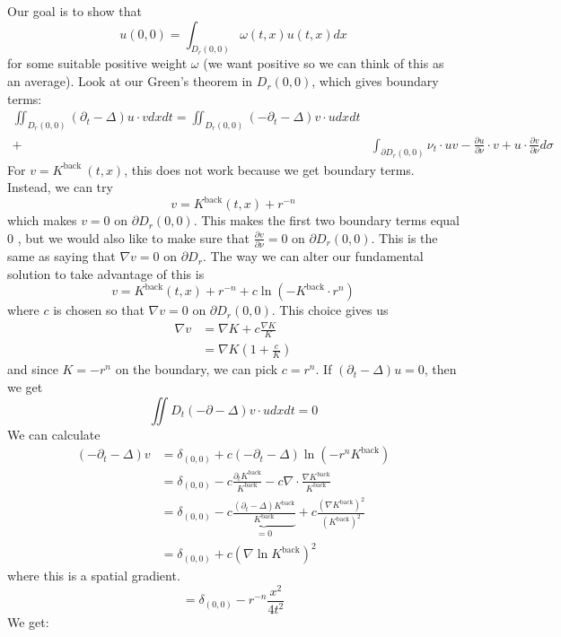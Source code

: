 Our goal is to show that
$$
u(0,0)=\int_{D_{r}(0,0)} \omega(t, x) u(t, x) d x
$$
for some suitable positive weight $\omega$ (we want positive so we can think of this as an average). Look at our Green's theorem in $D_{r}(0,0)$, which gives boundary terms:
$$
\begin{aligned}
\iint_{D_{r}(0,0)}\left(\partial_{t}-\Delta\right) u \cdot v d x d t=\iint_{D_{r}(0,0)}\left(-\partial_{t}-\Delta\right) v \cdot u d x d t & \\
+& \int_{\partial D_{r}(0,0)} \nu_{t} \cdot u v-\frac{\partial u}{\partial \nu} \cdot v+u \cdot \frac{\partial v}{\partial \nu} d \sigma
\end{aligned}
$$
For $v=K^{\text {back }}(t, x)$, this does not work because we get boundary terms. Instead, we can try
$$
v=K^{\mathrm{back}}(t, x)+r^{-n}
$$
which makes $v=0$ on $\partial D_{r}(0,0)$. This makes the first two boundary terms equal 0 , but we would also like to make sure that $\frac{\partial v}{\partial \nu}=0$ on $\partial D_{r}(0,0)$. This is the same as saying that $\nabla v=0$ on $\partial D_{r}$. The way we can alter our fundamental solution to take advantage of this is
$$
v=K^{\mathrm{back}}(t, x)+r^{-n}+c \ln \left(-K^{\mathrm{back}} \cdot r^{n}\right)
$$
where $c$ is chosen so that $\nabla v=0$ on $\partial D_{r}(0,0)$. This choice gives us
$$
\begin{aligned}
\nabla v &=\nabla K+c \frac{\nabla K}{K} \\
&=\nabla K\left(1+\frac{c}{K}\right)
\end{aligned}
$$
and since $K=-r^{n}$ on the boundary, we can pick $c=r^{n}$.
If $\left(\partial_{t}-\Delta\right) u=0$, then we get
$$
\iint D_{t}(-\partial-\Delta) v \cdot u d x d t=0
$$
We can calculate
$$
\begin{aligned}
\left(-\partial_{t}-\Delta\right) v &=\delta_{(0,0)}+c\left(-\partial_{t}-\Delta\right) \ln \left(-r^{n} K^{\mathrm{back}}\right) \\
&=\delta_{(0,0)}-c \frac{\partial_{t} K^{\mathrm{back}}}{K^{\mathrm{back}}}-c \nabla \cdot \frac{\nabla K^{\mathrm{back}}}{K^{\mathrm{back}}} \\
&=\delta_{(0,0)}-c \underbrace{\frac{\left(\partial_{t}-\Delta\right) K^{\mathrm{back}}}{K^{\mathrm{back}}}}_{=0}+c \frac{\left(\nabla K^{\mathrm{back}}\right)^{2}}{\left(K^{\mathrm{back}}\right)^{2}} \\
&=\delta_{(0,0)}+c\left(\nabla \ln K^{\mathrm{back}}\right)^{2}
\end{aligned}
$$
where this is a spatial gradient.
$$
=\delta_{(0,0)}-r^{-n} \frac{x^{2}}{4 t^{2}}
$$
We get:

